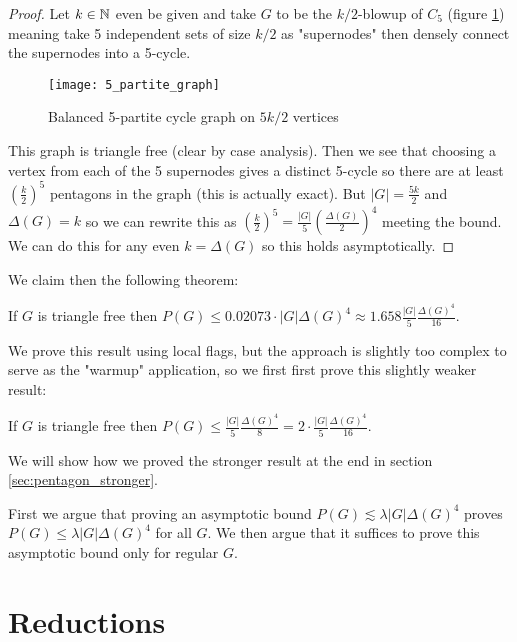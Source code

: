 \begin{proof}
    Let $k\in\mathbb{N}$ even be given and take $G$ to be the $k/2$-blowup of $C_5$
    (figure \ref{fig:5_partite_graph}) meaning take 5 independent sets of size $k/2$ as
    "supernodes" then densely connect the supernodes into a 5-cycle.
    \begin{figure}[ht]
        \centering
        \texttt{[image: 5\_partite\_graph]}
        \caption{Balanced 5-partite cycle graph on $5k/2$ vertices}
        \label{fig:5_partite_graph}
    \end{figure}
    This graph is triangle free (clear by case analysis).
    Then we see that choosing
    a vertex from each of the 5 supernodes gives a distinct 5-cycle so there are at
    least $\left(\frac{k}{2}\right)^5$ pentagons in the graph (this is actually exact). But
    $|G|=\frac{5k}{2}$ and $\Delta(G)=k$ so we can rewrite this as
    $\left(\frac{k}{2}\right)^5 = \frac{|G|}{5}\left(\frac{\Delta(G)}{2}\right)^4$ meeting
    the bound. We can do this for any even $k=\Delta(G)$ so this holds asymptotically.
\end{proof}

We claim then the following theorem:
\begin{theorem}
    \label{thm:full_pentagon_bound}
    If $G$ is triangle free then
    $P(G) \leq 0.02073 \cdot |G|\Delta(G)^4 \approx 1.658\frac{|G|}{5}\frac{\Delta(G)^4}{16}$.
\end{theorem}

We prove this result using local flags, but the approach is slightly too complex to serve
as the "warmup" application, so we first first prove this slightly weaker result:

\begin{theorem}
    \label{thm:simple_pentagon_bound}
    If $G$ is triangle free then
    $P(G) \leq \frac{|G|}{5}\frac{\Delta(G)^4}{8} = 2\cdot\frac{|G|}{5}\frac{\Delta(G)^4}{16}$.
\end{theorem}

We will show how we proved the stronger result at the end in section
\ref{sec:pentagon_stronger}.

First we argue that proving an asymptotic bound $P(G) \lesssim \lambda|G|\Delta(G)^4$
proves $P(G) \leq \lambda|G|\Delta(G)^4$ for all $G$.
We then argue that it suffices to prove this asymptotic bound only for regular $G$.

\section{Reductions}

